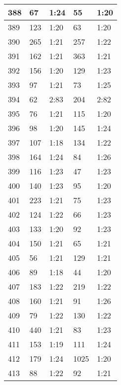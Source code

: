 \begin{center}
\begin{longtable}{|p{2cm}|l|l|l|l|}
388	&   67            &  1:24  &		55      	& 1:20 \\ \hline
389	&   123           &  1:20  &		63      	& 1:20 \\ \hline
390	&   265           &  1:21  &		257     	& 1:22 \\ \hline
391	&   162           &  1:21  &		363     	& 1:21 \\ \hline
392	&   156           &  1:20  &		129     	& 1:23 \\ \hline
393	&   97            &  1:21  &		73      	& 1:25 \\ \hline
394	&   62            &  2:83  &        204         & 2:82 \\ \hline
395	&   76            &  1:21  &		115     	& 1:20 \\ \hline
396	&   98            &  1:20  &		145     	& 1:24 \\ \hline
397	&   107           &  1:18  &		134     	& 1:22 \\ \hline
398	&   164           &  1:24  &		84      	& 1:26 \\ \hline
399	&   116           &  1:23  &		47      	& 1:23 \\ \hline
400	&   140           &  1:23  &		95      	& 1:20 \\ \hline
401	&   223           &  1:21  &		75      	& 1:23 \\ \hline
402	&   124           &  1:22  &		66          & 1:23 \\ \hline
403	&   133           &  1:20  &		92      	& 1:23 \\ \hline
404	&   150           &  1:21  &		65      	& 1:21 \\ \hline
405	&   56            &  1:21  &		129     	& 1:21 \\ \hline
406	&   89            &  1:18  &		44      	& 1:20 \\ \hline
407	&   183           &  1:22  &		219     	& 1:22 \\ \hline
408	&   160           &  1:21  &		91      	& 1:26 \\ \hline
409	&   79            &  1:22  &		130     	& 1:22 \\ \hline
410	&   440           &  1:21  &		83      	& 1:23 \\ \hline
411	&   153           &  1:19  &		111     	& 1:24 \\ \hline
412	&   179           &  1:24  &		1025    	& 1:20 \\ \hline
413	&   88            &  1:22  &		92      	& 1:21 \\ \hline

\end{longtable}
\end{center}
